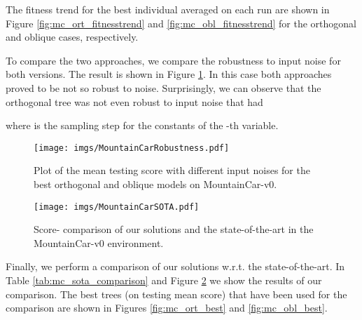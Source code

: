 \documentclass[review,english]{elsarticle}
\begin{document}
The fitness trend for the best individual averaged on each run are shown in Figure \ref{fig:mc_ort_fitnesstrend} and \ref{fig:mc_obl_fitnesstrend} for the orthogonal and oblique cases, respectively.

To compare the two approaches, we compare the robustness to input noise for both versions.
The result is shown in Figure \ref{fig:mc_noise_comparison}.
In this case both approaches proved to be not so robust to noise.
Surprisingly, we can observe that the orthogonal tree was not even robust to input noise that had 

where  is the sampling step for the constants of the -th variable.

\begin{figure}
    \centering
    \texttt{[image: imgs/MountainCarRobustness.pdf]}
    \caption{Plot of the mean testing score with different input noises for the best orthogonal and oblique models on MountainCar-v0.}
    \label{fig:mc_noise_comparison}
\end{figure}

\begin{figure}
    \centering
    \texttt{[image: imgs/MountainCarSOTA.pdf]}
    \caption{Score- comparison of our solutions and the state-of-the-art in the MountainCar-v0 environment.
    }
    \label{fig:mc_sota_comparison}
\end{figure}

Finally, we perform a comparison of our solutions w.r.t. the state-of-the-art.
In Table \ref{tab:mc_sota_comparison} and Figure \ref{fig:mc_sota_comparison} we show the results of our comparison.
The best trees (on testing mean score) that have been used for the comparison are shown in Figures \ref{fig:mc_ort_best} and \ref{fig:mc_obl_best}.

\newpage
\end{document}
